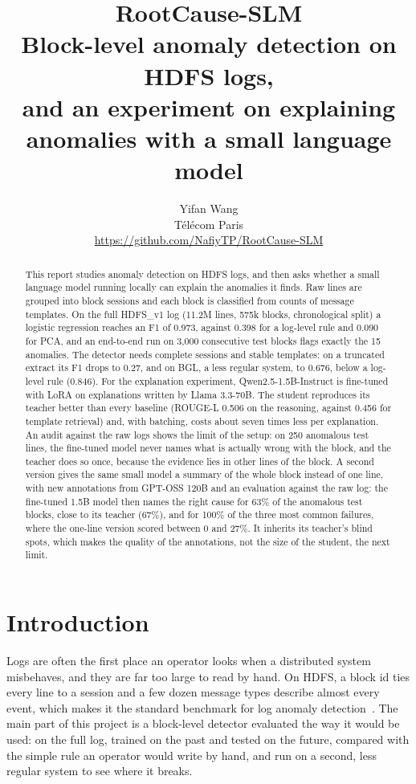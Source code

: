 \documentclass[11pt,a4paper]{article}
\title{\textbf{RootCause-SLM}\\[2pt]
\large Block-level anomaly detection on HDFS logs,\\ and an experiment on explaining anomalies with a small language model}
\author{Yifan Wang\\ \small Télécom Paris\\ \small \url{https://github.com/NafiyTP/RootCause-SLM}}
\date{}
\begin{document}
\maketitle

\begin{abstract}
This report studies anomaly detection on HDFS logs, and then asks whether a small language
model running locally can explain the anomalies it finds. Raw lines are grouped into block
sessions and each block is classified from counts of message templates. On the full HDFS\_v1
log (11.2M lines, 575k blocks, chronological split) a logistic regression reaches an F1 of
0.973, against 0.398 for a log-level rule and 0.090 for PCA, and an end-to-end run on 3,000
consecutive test blocks flags exactly the 15 anomalies. The detector needs complete sessions
and stable templates: on a truncated extract its F1 drops to 0.27, and on BGL, a less regular
system, to 0.676, below a log-level rule (0.846). For the explanation experiment,
Qwen2.5-1.5B-Instruct is fine-tuned with LoRA on explanations written by Llama 3.3-70B. The
student reproduces its teacher better than every baseline (ROUGE-L 0.506 on the reasoning,
against 0.456 for template retrieval) and, with batching, costs about seven times less per
explanation. An audit against the raw logs shows the limit of the setup: on 250 anomalous
test lines, the fine-tuned model never names what is actually wrong with the block, and the
teacher does so once, because the evidence lies in other lines of the block. A second version
gives the same small model a summary of the whole block instead of one line, with new
annotations from GPT-OSS 120B and an evaluation against the raw log: the fine-tuned 1.5B model
then names the right cause for 63\% of the anomalous test blocks, close to its teacher (67\%),
and for 100\% of the three most common failures, where the one-line version scored between 0 and 27\%.
It inherits its teacher's blind spots, which makes the quality of the annotations, not the
size of the student, the next limit.
\end{abstract}

\section{Introduction}

Logs are often the first place an operator looks when a distributed system misbehaves, and
they are far too large to read by hand. On HDFS, a block id ties every line to a session and a
few dozen message types describe almost every event, which makes it the standard benchmark for
log anomaly detection~\cite{xu2009,he2016,du2017,zhu2023}. The main part of this project is a
block-level detector evaluated the way it would be used: on the full log, trained on the past
and tested on the future, compared with the simple rule an operator would write by hand, and
run on a second, less regular system to see where it breaks.
\end{document}
